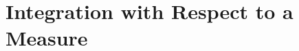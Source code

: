 \documentclass[11pt,fleqn]{book} %
\begin{document}








\chapter{Integration with Respect to a Measure}




\end{document}
